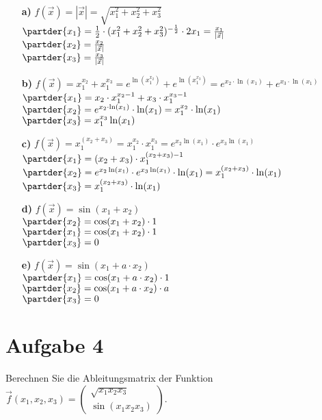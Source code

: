 \documentclass[ngerman, a4paper]{scrartcl}
\begin{document}
	\begin{itemize}
		\item[\textbf{a)}] $f(\vec{x}) = |\vec{x}| = \sqrt{x_1^2 + x_2^2 + x_3^2}$\\
		$\partder{x_1} = \frac{1}{2} \cdot (x_1^2 + x_2^2 + x_3^2)^{-\frac{1}{2}}\cdot 2x_1 = \frac{x_1}{|\vec{x}|}$\\
		$\partder{x_2} = \frac{x_2}{|\vec{x}|}$\\
		$\partder{x_3} = \frac{x_3}{|\vec{x}|}$\\
		
		\item[\textbf{b)}] $ f(\vec{x}) = x_1^{x_2} + x_1^{x_3}  = e^{\ln(x_1^{x_2})} + e^{\ln(x_1^{x_3})} = e^{x_2 \cdot\ln(x_1)} + e^{x_3 \cdot \ln(x_1)} $\\
		$\partder{x_1} = x_2 \cdot x_1^{x_2-1} + x_3\cdot x_1^{x_3-1}$\\
		$\partder{x_2} = e^{x_2 \cdot \ln(x_1)} \cdot \ln(x_1) = x_1^{x_2}\cdot \ln(x_1)$\\
		$\partder{x_3} = x_1^{x_3}\ln(x_1)$
		
		\item[\textbf{c)}] $ f(\vec{x}) = x_1^{(x_2 + x_3)} = x_1^{x_2} \cdot x_1^{x_3} = e^{x_2\ln(x_1)} \cdot e^{x_3\ln(x_1)} $\\
		$\partder{x_1} = (x_2 + x_3)\cdot x_1^{(x_2 + x_3)-1}$\\
		$\partder{x_2} = e^{x_2\ln(x_1)} \cdot e^{x_3\ln(x_1)} \cdot \ln(x_1) = x_1^{(x_2 + x_3)} \cdot \ln(x_1)$\\
		$\partder{x_3} = x_1^{(x_2 + x_3)} \cdot \ln(x_1)$
		
		\item[\textbf{d)}] $f(\vec{x}) = \sin(x_1 + x_2)$\\
		$\partder{x_2} = \cos(x_1 + x_2) \cdot 1$\\
		$\partder{x_1} = \cos(x_1 + x_2) \cdot 1$\\
		$\partder{x_3} = 0$
		 
		\item[\textbf{e)}] $f(\vec{x}) = \sin(x_1 + a\cdot x_2)$\\
		$\partder{x_1} = \cos(x_1 + a\cdot x_2) \cdot 1$\\
		$\partder{x_2} = \cos(x_1 + a\cdot x_2) \cdot a$\\
		$\partder{x_3} = 0$\\
	\end{itemize}
	
	\section*{Aufgabe 4}
	Berechnen Sie die Ableitungsmatrix der Funktion $\vec{f}(x_1, x_2, x_3) = \begin{pmatrix}
		\sqrt{x_1x_2x_3}\\
		\sin(x_1x_2x_3)
	\end{pmatrix}$.
	
\end{document}
